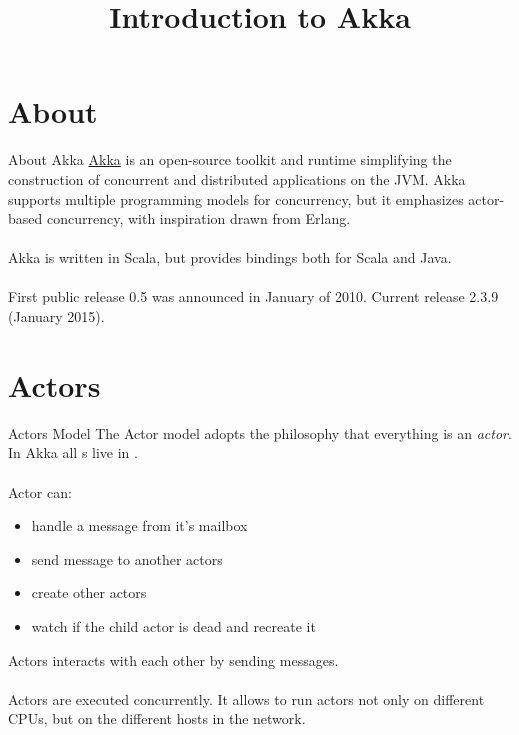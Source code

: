 

\title{Introduction to Akka}



\begin{frame}
    \titlepage
\end{frame}

\section{About}

\begin{frame}{About Akka}
\href{http://www.akka.io}{Akka} is an open-source toolkit and runtime simplifying the construction of concurrent
and distributed applications on the JVM. Akka supports multiple programming models
for concurrency, but it emphasizes actor-based concurrency, with inspiration drawn from Erlang.\\~\\

Akka is written in Scala, but provides bindings both for Scala and Java.\\~\\

First public release 0.5 was announced in January of 2010. Current release 2.3.9 (January 2015).
\end{frame}

\section{Actors}

\begin{frame}{Actors Model}
The Actor model adopts the philosophy that everything is an \emph{actor}.  In Akka all s
live in .\\~\\

Actor can:
\begin{itemize}
\item handle a message from it's mailbox
\item send message to another actors
\item create other actors
\item watch if the child actor is dead and recreate it
\end{itemize}
Actors interacts with each other  by sending messages.\\~\\

Actors are executed concurrently.  It allows to run actors not only on different CPUs, but on the
different hosts in the network.
\end{frame}

